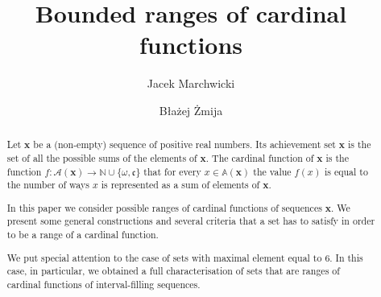 \documentclass{amsart}
\author{Jacek Marchwicki}
\author{B\l{}a\.zej \.Zmija}
\title[Bounded ranges of cardinal functions]{Bounded ranges of cardinal functions}
\theoremstyle{definition}
\begin{document}
\begin{abstract}
Let $\mathbf{x}$ be a (non-empty) sequence of positive real numbers. Its achievement set $\mathcal{\mathbf{x}}$ is the set of all the possible sums of the elements of $\mathbf{x}$. The cardinal function of $\mathbf{x}$ is the function $f:\mathcal{A}(\mathbf{x}) \to \mathbb{N}\cup\{\omega,\mathfrak{c}\}$ that for every $x\in\mathbb{A}(\mathbf{x})$ the value $f(x)$ is equal to the number of ways $x$ is represented as a sum of elements of $\mathbf{x}$.

In this paper we consider possible ranges of cardinal functions of sequences $\mathbf{x}$. We present some general constructions and several criteria that a set has to satisfy in order to be a range of a cardinal function.

We put special attention to the case of sets with maximal element equal to $6$. In this case, in particular, we obtained a full characterisation of sets that are ranges of cardinal functions of interval-filling sequences.



\end{abstract}

\maketitle 
\end{document}
